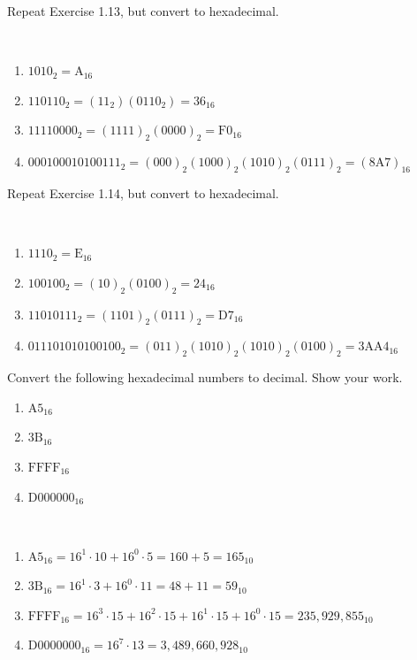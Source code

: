 \documentclass[12pt]{article}
\newenvironment{ex}[2][Exercise]{\begin{trivlist}
		\item[\hskip \labelsep {\bfseries #1}\hskip \labelsep {\bfseries #2.}]}{\end{trivlist}}
\newenvironment{sol}[1][Solution]{\begin{trivlist}
		\item[\hskip \labelsep {\bfseries #1:}]}{\end{trivlist}}
\begin{document}
\begin{ex}{1.15} Repeat Exercise 1.13, but convert to hexadecimal.
\end{ex}

\begin{sol}\
	\begin{enumerate}[label=(\alph*)]
		\item $1010_2=\text{A}_{16}$
		\item $110110_2=(11_2)(0110_2)=36_{16}$
		\item $11110000_2=(1111)_2(0000)_2=\text{F}0_{16}$
		\item $000100010100111_2=(000)_2(1000)_2(1010)_2(0111)_2=(8\text{A}7)_{16}$
\end{enumerate}	
\end{sol}

\begin{ex}{1.16} Repeat Exercise 1.14, but convert to hexadecimal.
\end{ex}

\begin{sol}\
	\begin{enumerate}[label=(\alph*)]
		\item $1110_2=\text{E}_{16}$
		\item $100100_2=(10)_2(0100)_2=24_{16}$
		\item $11010111_2=(1101)_2(0111)_2=\text{D}7_{16}$
		\item $011101010100100_2=(011)_2(1010)_2(1010)_2(0100)_2=\text{3AA4}_{16}$
	\end{enumerate}	
\end{sol}

\begin{ex}{1.17} Convert the following hexadecimal numbers to decimal. Show your work.
	\begin{enumerate}[label=(\alph*)]
		\item $\text{A5}_{16}$
		\item $\text{3B}_{16}$
		\item $\text{FFFF}_{16}$
		\item $\text{D000000}_{16}$
	\end{enumerate}
\end{ex}

\begin{sol}\
	\begin{enumerate}[label=(\alph*)]
		\item $\text{A5}_{16}=16^1\cdot 10+16^0\cdot 5=160+5=165_{10}$
		\item $\text{3B}_{16}=16^{1}\cdot 3+16^{0}\cdot 11=48+11=59_{10}$
		\item $\text{FFFF}_{16}=16^{3}\cdot 15+16^{2}\cdot 15+16^{1}\cdot 15+16^{0}\cdot 15=235,929,855_{10}$
		\item $\text{D0000000}_{16}=16^{7}\cdot 13=3,489,660,928_{10}$
	\end{enumerate}	
\end{sol}
\end{document}
